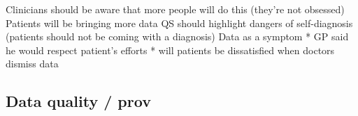 \documentclass{sigchi}
\begin{document}
Clinicians should be aware that more people will do this (they're not obsessed)
Patients will be bringing more data
QS should highlight dangers of self-diagnosis (patients should not be coming with a diagnosis)
Data as a symptom
* GP said he would respect patient's efforts
* will patients be dissatisfied when doctors dismiss data

\subsection{Data quality / prov}



\end{document}
